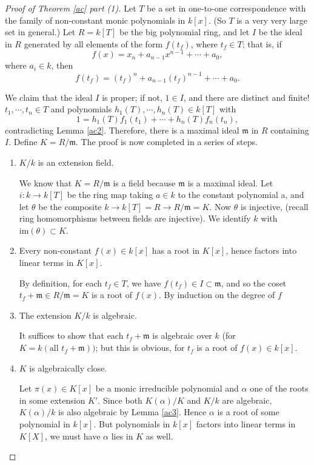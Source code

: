 \documentclass[12pt]{report}
\theoremstyle{definition}
\def\im{\text{im}}
\def\aa{\alpha}
\def\mm{\mathfrak{m}}
\begin{document}
\begin{proof}[Proof of Theorem \ref{ac} part (1)]
    Let $T$ be a set in one-to-one correspondence with the family of non-constant monic polynomials in $k[x]$. (So $T$ is a very very large set in general.) Let $R = k[T]$ be the big polynomial ring, and let $I$ be the ideal in $R$ generated by all elements of the form $f(t_f)$, where $t_f\in T$; that is, if $$f(x) = x_n + a_{n-1}x^{n-1} + \cdots + a_0,$$ where $a_i \in k$, then $$f(t_f) = (t_f)^n + a_{n-1}(t_f)^{n-1} + \cdots + a_0.$$

    We claim that the ideal $I$ is proper; if not, $1 \in I$, and there are distinct and finite! $t_1, \cdots , t_n \in T$ and polynomials $h_1(T), \cdots , h_n(T) \in k[T]$ with $$ 1 = h_1(T)f_1(t_1) + \cdots + h_n(T)f_n(t_n),$$ contradicting Lemma \ref{ac2}. Therefore, there is a maximal ideal $\mm$ in $R$ containing $I$. Define $K = R/\mm$. The proof is now completed in a series of steps.
    \begin{enumerate}
        \item $K/k$ is an extension field.
        
        We know that $K = R/\mm$ is a field because $\mm$ is a maximal ideal. Let $i : k \to  k[T]$ be the ring map taking $a \in k$ to the constant polynomial a, and let $\theta$ be the composite $k\to 
        k[T] = R\to R/\mm  = K$. Now $\theta$ is injective, (recall ring homomorphisms between fields are injective). We identify $k$ with $ \im (\theta)  \subset K$.

        \item  Every non-constant $f(x) \in k[x]$ has a root in $K[x]$, hence factors into linear terms in $K[x]$.
        
        By definition, for each $t_f \in T$, we have $f(t_f ) \in I \subset \mm$, and so the coset $t_f +\mm \in R/\mm  = K$ is a root of $f(x)$. By induction on the degree of $f$

        \item The extension $K/k$ is algebraic.
        
        It suffices to show that each $t_f+\mm$ is algebraic over $k$ (for $K = k(\mbox{all } t_f + \mm))$; but this is obvious, for $t_f$ is a root of $f(x) \in k[x]$.

        \item $K$ is algebraically close.
        
        Let $\pi(x)\in K[x]$ be a monic irreducible polynomial and $\aa$ one of the roots in some extension $K'$. Since both $K(\aa)/K$ and $K/k$ are algebraic, $K(\aa)/k$ is also algebraic by Lemma \ref{ac3}. Hence $\aa$ is a root of some polynomial in $k[x]$. But polynomials in $k[x]$ factors into linear terms in $K[X]$, we must have $\aa$ lies in $K$ as well. 
    \end{enumerate}
\end{proof}
\end{document}
